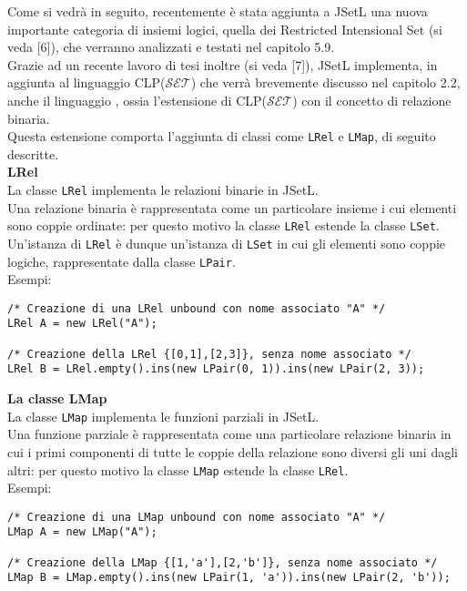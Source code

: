 Come si vedrà in seguito, recentemente è stata aggiunta a JSetL una nuova importante categoria di insiemi logici, quella dei Restricted Intensional Set (si veda [6]), che verranno analizzati e testati nel capitolo 5.9.\\
Grazie ad un recente lavoro di tesi inoltre (si veda [7]), JSetL implementa, in aggiunta al linguaggio CLP(\(\mathcal{SET}\)) che verrà brevemente discusso nel capitolo 2.2, anche il linguaggio , ossia l'estensione di CLP(\(\mathcal{SET}\)) con il concetto di relazione binaria.\\
Questa estensione comporta l'aggiunta di classi come \texttt{LRel} e \texttt{LMap}, di seguito descritte.\\

\textbf{LRel}\\
La classe \texttt{LRel} implementa le relazioni binarie in JSetL.\\
Una relazione binaria è rappresentata come un particolare insieme i cui elementi sono coppie ordinate: per questo motivo la classe \texttt{LRel} estende la classe \texttt{LSet}.\\
Un'istanza di \texttt{LRel} è dunque un'istanza di \texttt{LSet} in cui gli elementi sono coppie logiche, rappresentate dalla classe \texttt{LPair}.\\
Esempi:\\

\begin{lstlisting}
/* Creazione di una LRel unbound con nome associato "A" */
LRel A = new LRel("A");

/* Creazione della LRel {[0,1],[2,3]}, senza nome associato */
LRel B = LRel.empty().ins(new LPair(0, 1)).ins(new LPair(2, 3));
\end{lstlisting}

\clearpage

\textbf{La classe LMap}\\
La classe \texttt{LMap} implementa le funzioni parziali in JSetL.\\
Una funzione parziale è rappresentata come una particolare relazione binaria in cui i primi componenti di tutte le coppie della relazione sono diversi gli uni dagli altri: per questo motivo la classe \texttt{LMap} estende la classe \texttt{LRel}.\\
Esempi:\\

\begin{lstlisting}
/* Creazione di una LMap unbound con nome associato "A" */
LMap A = new LMap("A");

/* Creazione della LMap {[1,'a'],[2,'b']}, senza nome associato */
LMap B = LMap.empty().ins(new LPair(1, 'a')).ins(new LPair(2, 'b'));
\end{lstlisting}

